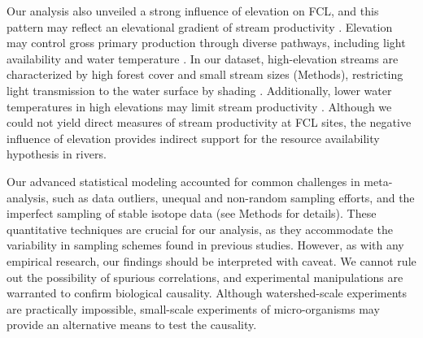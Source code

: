 \documentclass[11pt, class=article, crop=false]{standalone}
\begin{document}
Our analysis also unveiled a strong influence of elevation on FCL, and this pattern may reflect an elevational gradient of stream productivity \citep{marzolf_ecosystem_2021}.
Elevation may control gross primary production through diverse pathways, including light availability and water temperature \citep{marzolf_ecosystem_2021, atkinson_determinants_2018}.
In our dataset, high-elevation streams are characterized by high forest cover and small stream sizes (Methods), restricting light transmission to the water surface by shading \citep{finlay_light-mediated_2011, finlay_human_2013, bernhardt_light_2022}.
Additionally, lower water temperatures in high elevations may limit stream productivity \citep{demars_temperature_2011}.
Although we could not yield direct measures of stream productivity at FCL sites, the negative influence of elevation provides indirect support for the resource availability hypothesis in rivers.


Our advanced statistical modeling accounted for common challenges in meta-analysis, such as data outliers, unequal and non-random sampling efforts, and the imperfect sampling of stable isotope data (see Methods for details).
These quantitative techniques are crucial for our analysis, as they accommodate the variability in sampling schemes found in previous studies.
However, as with any empirical research, our findings should be interpreted with caveat.
We cannot rule out the possibility of spurious correlations, and experimental manipulations are warranted to confirm biological causality.
Although watershed-scale experiments are practically impossible, small-scale experiments of micro-organisms may provide an alternative means to test the causality.
\end{document}
